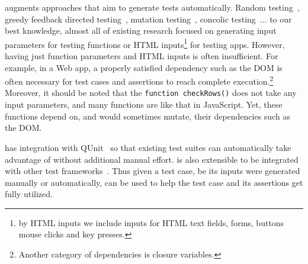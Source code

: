 \tool augments approaches that aim to generate tests automatically.  
Random testing~\cite{artemis}, greedy feedback directed testing~\cite{}, mutation testing~\cite{pythia}, concolic testing~\cite{cute}... to our best knowledge, almost all of existing research focused on generating input parameters for testing functions or HTML inputs\footnote{by HTML inputs we include inputs for HTML text fields, forms, buttons mouse clicks and key presses.} for testing apps.
However, having just function parameters and HTML inputs is often insufficient.  For example, in a Web app, a properly satisfied dependency such as the DOM is often necessary for test cases and assertions to reach complete execution.\footnote{Another category of dependencies is closure variables.}
Moreover, it should be noted that the {\tt function checkRows()} does not take any input parameters, and many functions are like that in JavaScript.
Yet, these functions depend on, and would sometimes mutate, their dependencies such as the DOM.

\tool has integration with QUnit~\cite{qunit} so that existing test suites can automatically take advantage of \tool without additional manual effort.  \tool is also extensible to be integrated with other test frameworks~\cite{jstests}.
Thus given a test case, be its inputs were generated manually or automatically, \tool can be used to help the test case and its assertions get fully utilized.


